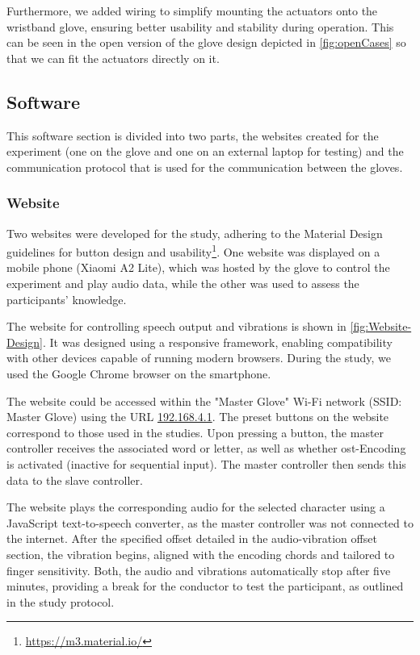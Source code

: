 Furthermore, we added wiring to simplify mounting the actuators onto the wristband glove, ensuring better usability and stability during operation.
This can be seen in the open version of the glove design depicted in \autoref{fig:openCases} so that we can fit the actuators directly on it.

\subsection{Software}

This software section is divided into two parts, the websites created for the experiment (one on the glove and one on an external laptop for testing) and the communication protocol that is used for the communication between the gloves.

\subsubsection{Website}
\label{sub:website}
Two websites were developed for the study, adhering to the Material Design guidelines for button design and usability\footnote{\url{https://m3.material.io/}}. One website was displayed on a mobile phone (Xiaomi A2 Lite), which was hosted by the glove to control the experiment and play audio data, while the other was used to assess the participants' knowledge.

The website for controlling speech output and vibrations is shown in \autoref{fig:Website-Design}. It was designed using a responsive framework, enabling compatibility with other devices capable of running modern browsers. During the study, we used the Google Chrome browser on the smartphone.

The website could be accessed within the "Master Glove" Wi-Fi network (SSID: Master Glove) using the URL \url{192.168.4.1}.
The preset buttons on the website correspond to those used in the studies.
Upon pressing a button, the master controller receives the associated word or letter, as well as whether \gls{ost}-Encoding is activated (inactive for sequential input).
The master controller then sends this data to the slave controller.

The website plays the corresponding audio for the selected character using a JavaScript text-to-speech converter, as the master controller was not connected to the internet.
After the specified offset detailed in the audio-vibration offset section, the vibration begins, aligned with the encoding chords and tailored to finger sensitivity.
Both, the audio and vibrations automatically stop after five minutes, providing a break for the conductor to test the participant, as outlined in the study protocol.

